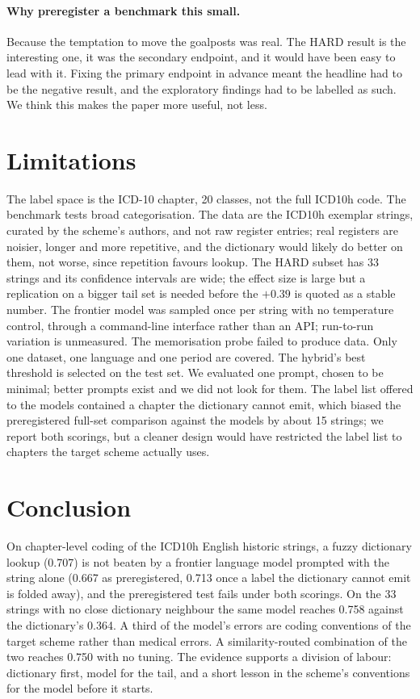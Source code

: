 \documentclass[11pt]{article}
\begin{document}
\paragraph{Why preregister a benchmark this small.} Because the temptation to move the goalposts was real. The HARD result is the interesting one, it was the secondary endpoint, and it would have been easy to lead with it. Fixing the primary endpoint in advance meant the headline had to be the negative result, and the exploratory findings had to be labelled as such. We think this makes the paper more useful, not less.

\section{Limitations}

The label space is the ICD-10 chapter, 20 classes, not the full ICD10h code. The benchmark tests broad categorisation. The data are the ICD10h exemplar strings, curated by the scheme's authors, and not raw register entries; real registers are noisier, longer and more repetitive, and the dictionary would likely do better on them, not worse, since repetition favours lookup. The HARD subset has 33 strings and its confidence intervals are wide; the effect size is large but a replication on a bigger tail set is needed before the $+0.39$ is quoted as a stable number. The frontier model was sampled once per string with no temperature control, through a command-line interface rather than an API; run-to-run variation is unmeasured. The memorisation probe failed to produce data. Only one dataset, one language and one period are covered. The hybrid's best threshold is selected on the test set. We evaluated one prompt, chosen to be minimal; better prompts exist and we did not look for them. The label list offered to the models contained a chapter the dictionary cannot emit, which biased the preregistered full-set comparison against the models by about 15 strings; we report both scorings, but a cleaner design would have restricted the label list to chapters the target scheme actually uses.

\section{Conclusion}

On chapter-level coding of the ICD10h English historic strings, a fuzzy dictionary lookup (0.707) is not beaten by a frontier language model prompted with the string alone (0.667 as preregistered, 0.713 once a label the dictionary cannot emit is folded away), and the preregistered test fails under both scorings. On the 33 strings with no close dictionary neighbour the same model reaches 0.758 against the dictionary's 0.364. A third of the model's errors are coding conventions of the target scheme rather than medical errors. A similarity-routed combination of the two reaches 0.750 with no tuning. The evidence supports a division of labour: dictionary first, model for the tail, and a short lesson in the scheme's conventions for the model before it starts.
\end{document}
